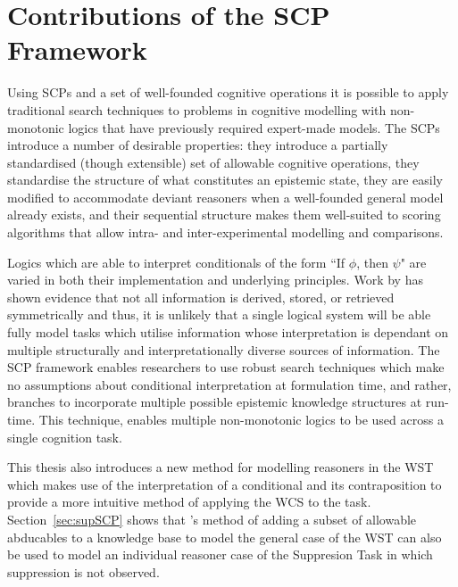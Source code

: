 \section{Contributions of the SCP Framework} \label{sec:contributions}
Using SCPs and a set of well-founded cognitive operations it is possible to apply traditional search techniques to problems in cognitive modelling with non-monotonic logics that have previously required expert-made models. The SCPs introduce a number of desirable properties: they introduce a partially standardised (though extensible) set of allowable cognitive operations, they standardise the structure of what constitutes an epistemic state, they are easily modified to accommodate deviant reasoners when a well-founded general model already exists, and their sequential structure makes them well-suited to scoring algorithms that allow intra- and inter-experimental modelling and comparisons.

Logics which are able to interpret conditionals of the form ``If $\phi$, then $\psi$" are varied in both their implementation and underlying principles. Work by \citep{heit2005defending} has shown evidence that not all information is derived, stored, or retrieved symmetrically and thus, it is unlikely that a single logical system will be able fully model tasks which utilise information whose interpretation is dependant on multiple structurally and interpretationally diverse sources of information. The SCP framework enables researchers to use robust search techniques which make no assumptions about conditional interpretation at formulation time, and rather, branches to incorporate multiple possible epistemic knowledge structures at run-time. This technique, enables multiple non-monotonic logics to be used across a single cognition task.

This thesis also introduces a new method for modelling reasoners in the WST which makes use of the interpretation of a conditional and its contraposition to provide a more intuitive method of applying the WCS to the task. Section~\ref{sec:supSCP} shows that \citep{dietz2014modeling}'s method of adding a subset of allowable abducables to a knowledge base to model the general case of the WST can also be used to model an individual reasoner case of the Suppresion Task in which suppression is not observed.

